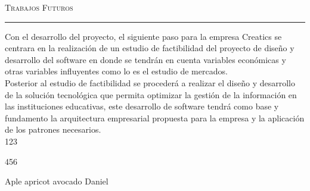 \vspace*{3cm}
\noindent\Huge\textsc{Trabajos Futuros}\\
\normalsize
\noindent\rule[2pt]{\textwidth}{0.8pt}
\hspace*{3cm}

Con el desarrollo del proyecto, el siguiente paso para la empresa Creatics se centrara en la realización de un estudio de factibilidad del proyecto de diseño y desarrollo del software en donde se tendrán en cuenta variables económicas y otras variables influyentes como lo es el estudio de mercados. \\

Posterior al estudio de factibilidad se procederá a realizar el diseño y desarrollo de la solución tecnológica que permita optimizar la gestión de la información en las instituciones educativas, este desarrollo de software tendrá como base y fundamento la arquitectura empresarial propuesta para la empresa y la aplicación de los patrones necesarios. \\

\cite{Jurgens:2000,Jurgens:1995,Miede:2011,Kohm:2011,Apple:keynote:2010,Apple:numbers:2010,Apple:pages:2010}123

\cite{WEB:GNU:GPL:2010,WEB:Miede:2011}456


Aple  apricot  avocado 
Daniel 